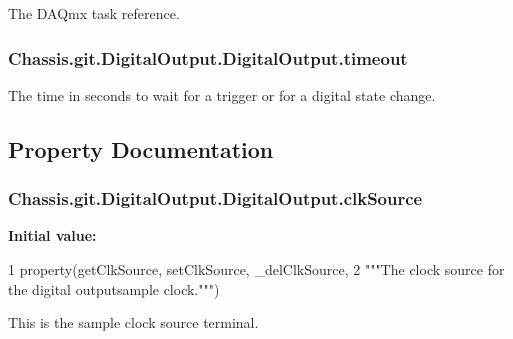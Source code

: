 The D\-A\-Qmx task reference. 

\hypertarget{class_chassis_8git_1_1_digital_output_1_1_digital_output_a869babc61b66d203a05e3e1998bb4a9f}{
\subsubsection[{timeout}]{\setlength{\rightskip}{0pt plus 5cm}Chassis.\-git.\-Digital\-Output.\-Digital\-Output.\-timeout}}\label{class_chassis_8git_1_1_digital_output_1_1_digital_output_a869babc61b66d203a05e3e1998bb4a9f}


The time in seconds to wait for a trigger or for a digital state change. 



\subsection{Property Documentation}
\hypertarget{class_chassis_8git_1_1_digital_output_1_1_digital_output_ac73336fea1019e4177461ac06c3f26a7}{
\subsubsection[{clk\-Source}]{\setlength{\rightskip}{0pt plus 5cm}Chassis.\-git.\-Digital\-Output.\-Digital\-Output.\-clk\-Source\hspace{0.3cm}{\ttfamily [static]}}}\label{class_chassis_8git_1_1_digital_output_1_1_digital_output_ac73336fea1019e4177461ac06c3f26a7}
{\bfseries Initial value\-:}
\begin{DoxyCode}
1 property(getClkSource, setClkSource, \_delClkSource,
2     \textcolor{stringliteral}{"""The clock source for the digital outputsample clock."""})
\end{DoxyCode}


This is the sample clock source terminal. 


